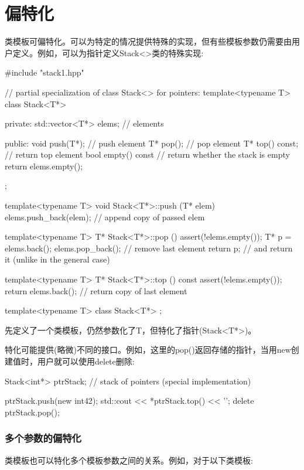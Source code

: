 \section{偏特化}

类模板可偏特化。可以为特定的情况提供特殊的实现，但有些模板参数仍需要由用户定义。例如，可以为指针定义Stack<>类的特殊实现:

\begin{cpp}
#include "stack1.hpp"

// partial specialization of class Stack<> for pointers:
template<typename T>
class Stack<T*> {
private:
	std::vector<T*> elems; // elements
	
public:
	void push(T*); // push element
	T* pop(); // pop element
	T* top() const; // return top element
	bool empty() const { // return whether the stack is empty
		return elems.empty();
	}
};

template<typename T>
void Stack<T*>::push (T* elem)
{
	elems.push_back(elem); // append copy of passed elem
}

template<typename T>
T* Stack<T*>::pop ()
{
	assert(!elems.empty());
	T* p = elems.back();
	elems.pop_back(); // remove last element
	return p; // and return it (unlike in the general case)
}

template<typename T>
T* Stack<T*>::top () const
{
	assert(!elems.empty());
	return elems.back(); // return copy of last element
}
\end{cpp}

\begin{cpp}
template<typename T>
class Stack<T*> {
};
\end{cpp}

先定义了一个类模板，仍然参数化了T，但特化了指针(Stack<T*>)。

特化可能提供(略微)不同的接口。例如，这里的pop()返回存储的指针，当用new创建值时，用户就可以使用delete删除:

\begin{cpp}
Stack<int*> ptrStack; // stack of pointers (special implementation)

ptrStack.push(new int{42});
std::cout << *ptrStack.top() << '\n';
delete ptrStack.pop();
\end{cpp}

\subsubsection{多个参数的偏特化}

类模板也可以特化多个模板参数之间的关系。例如，对于以下类模板:

